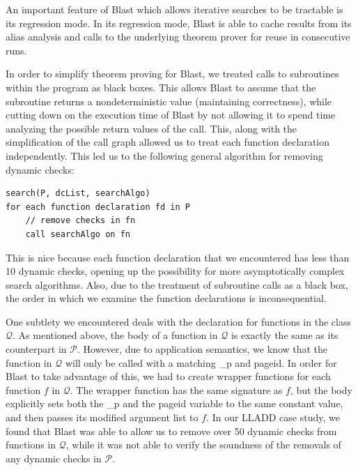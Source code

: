 \documentclass[10pt,letterpaper,twocolumn,english]{article}
\newcommand{\fP}{{$\mathcal P$}\xspace}
\newcommand{\fQ}{{$\mathcal Q$}\xspace}
\begin{document}
An important feature of Blast which allows iterative searches to
be tractable is its regression mode.  In its regression mode, Blast is able
to cache results from its alias analysis and calls to the underlying
theorem prover for reuse in consecutive runs.

In order to simplify theorem proving for Blast, we treated calls to
subroutines within the program as black boxes.  This allows Blast to
assume that the subroutine returns a nondeterministic value
(maintaining correctness), while cutting down on the execution time of
Blast by not allowing it to spend time analyzing the possible return
values of the call.  This, along with the simplification of the call
graph allowed us to treat each function declaration independently.  This
led us to the following general algorithm for removing dynamic checks:

\begin{verbatim}
search(P, dcList, searchAlgo)
for each function declaration fd in P
    // remove checks in fn
    call searchAlgo on fn 
\end{verbatim}

This is nice because each function declaration that we encountered has
less than 10 dynamic checks, opening up the possibility for more
asymptotically complex search algorithms.  Also, due to the treatment of
subroutine calls as a black box, the order in which we examine the
function declarations is inconsequential.

One subtlety we encountered deals with the declaration for functions in the
class \fQ.  As mentioned above, the body of a function in \fQ is exactly
the same as its counterpart in \fP.  However, due to application
semantics, we know that the function in \fQ will only be called with a
matching \_p and pageid.  In order for Blast to take advantage of this,
we had to create wrapper functions for each function $f$ in \fQ.  The
wrapper function has the same signature as $f$, but the body explicitly
sets both the \_p and the pageid variable to the same constant value,
and then passes its modified argument list to $f$.  In our LLADD case
study, we found that Blast was able to allow us to remove over 50
dynamic checks from functions in \fQ, while it was not able to verify
the soundness of the removals of any dynamic checks in \fP.
\end{document}
